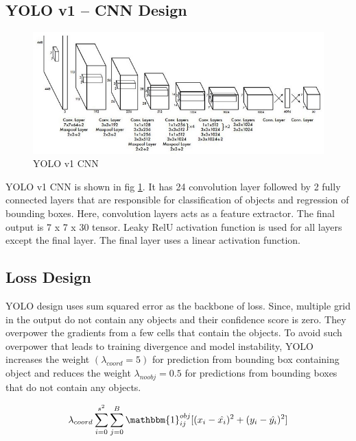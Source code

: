             \subsection{YOLO v1 -- CNN Design}
                \begin{figure}[ht]
                    \centering
                    \includegraphics[width=1.0\textwidth]{img/yolov1_CNN-design.jpeg}
                    \caption{YOLO v1 CNN}
                    \label{fig:yolov1cnn}
                \end{figure}
                YOLO v1 CNN is shown in fig \ref{fig:yolov1cnn}.\cite{redmon2016you} It has 24 convolution layer followed by 2 fully connected layers that are responsible for classification of objects and regression of bounding boxes. Here, convolution layers acts as a feature extractor. The final output is 7 x 7 x 30 tensor. Leaky RelU activation function is used for all layers except the final layer. The final layer uses a linear activation function.
                \pagebreak
            \subsection{Loss Design}
                YOLO design uses sum squared error as the backbone of loss.\cite{redmon2016you} Since, multiple grid in the output do not contain any objects and their confidence score is zero. They overpower the gradients from a few cells that contain the objects. To avoid such overpower that leads to training divergence and model instability, YOLO increases the weight $(\lambda_{coord} = 5)$ for prediction from bounding box containing object and reduces the weight $\lambda_{noobj}=0.5$ for predictions from bounding boxes that do not contain any objects.

                \begin{equation}
                    \label{eqn:yolov1losspart1}
                    \lambda_{coord} \sum_{i=0}^{s^2} \sum_{j=0}^{B} \mathbbm{1}_{i j}^{obj} [(x_i-\hat{x_i})^2 + (y_i - \hat{y_i})^2]
                \end{equation}

